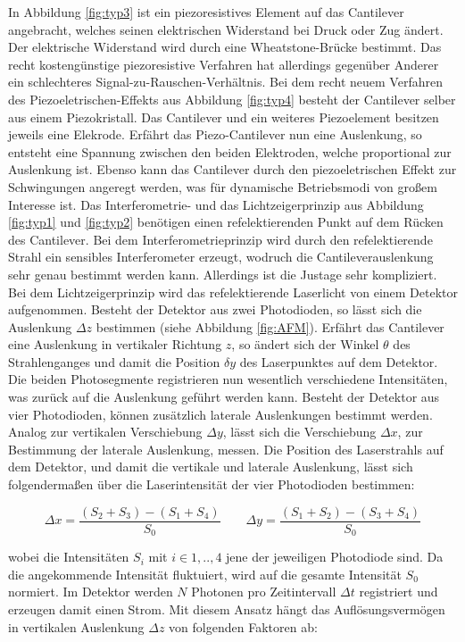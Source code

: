 \noindent
In Abbildung \ref{fig:typ3} ist ein piezoresistives Element auf das Cantilever
angebracht, welches seinen elektrischen Widerstand bei Druck oder Zug ändert.
Der elektrische Widerstand wird durch eine Wheatstone-Brücke bestimmt. Das
recht kostengünstige piezoresistive Verfahren hat allerdings gegenüber Anderer
ein schlechteres Signal-zu-Rauschen-Verhältnis.
Bei dem recht neuem Verfahren des Piezoeletrischen-Effekts aus Abbildung \ref{fig:typ4}
besteht der Cantilever selber aus einem Piezokristall. Das Cantilever und
ein weiteres Piezoelement besitzen jeweils eine Elekrode. Erfährt das Piezo-Cantilever
nun eine Auslenkung, so entsteht eine Spannung zwischen den beiden Elektroden,
welche proportional zur Auslenkung ist. Ebenso kann das Cantilever durch den
piezoeletrischen Effekt zur Schwingungen angeregt werden, was für dynamische
Betriebsmodi von großem Interesse ist.
Das Interferometrie- und das Lichtzeigerprinzip aus Abbildung \ref{fig:typ1} und
\ref{fig:typ2} benötigen einen refelektierenden Punkt auf dem Rücken des Cantilever.
Bei dem Interferometrieprinzip wird durch den refelektierende Strahl ein sensibles
Interferometer erzeugt, wodruch die Cantileverauslenkung sehr genau bestimmt
werden kann. Allerdings ist die Justage sehr kompliziert.
Bei dem Lichtzeigerprinzip wird das refelektierende Laserlicht von einem Detektor aufgenommen.
Besteht der Detektor aus zwei Photodioden, so lässt sich die Auslenkung $\Delta z$
bestimmen (siehe Abbildung \ref{fig:AFM}). Erfährt das Cantilever eine Auslenkung
in vertikaler Richtung $z$, so ändert sich der Winkel $\theta$ des Strahlenganges
und damit die Position $\delta y$ des Laserpunktes auf dem Detektor. Die beiden
Photosegmente registrieren nun wesentlich verschiedene Intensitäten, was zurück
auf die Auslenkung geführt werden kann. Besteht der Detektor aus vier Photodioden,
können zusätzlich laterale Auslenkungen bestimmt werden. Analog zur vertikalen
Verschiebung $\Delta y$, lässt sich die Verschiebung $\Delta x$, zur Bestimmung der
laterale Auslenkung, messen. Die Position des Laserstrahls auf dem Detektor, und
damit die vertikale und laterale Auslenkung, lässt sich folgendermaßen über die
Laserintensität der vier Photodioden bestimmen:

\begin{equation}
  \Delta x = \frac{(S_2 + S_3)-(S_1 + S_4)}{S_0}
  \qquad
  \Delta y = \frac{(S_1 + S_2)-(S_3 + S_4)}{S_0}
  \label{eq:F2}
\end{equation}

\noindent
wobei die Intensitäten $S_i$ mit $i \in {1,..,4}$ jene der jeweiligen Photodiode sind.
Da die angekommende Intensität fluktuiert, wird auf die gesamte Intensität $S_0$
normiert. Im Detektor werden $N$ Photonen pro Zeitintervall $\Delta t$ registriert
und erzeugen damit einen Strom. Mit diesem Ansatz hängt das Auflösungsvermögen
\cite[165]{AFM} in vertikalen Auslenkung $\Delta z$ von folgenden Faktoren ab:

